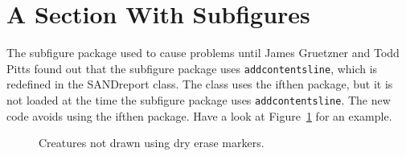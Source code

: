 \documentclass[pdf,ps2pdf,12pt,strict,OUO]{SANDreport}
\begin{document}
    \section{A Section With Subfigures}
	The subfigure package used to cause problems until James
	Gruetzner and Todd Pitts found out that the subfigure
	package uses {\tt addcontentsline}, which is redefined in
	the SANDreport class. The class uses the ifthen package,
	but it is not loaded at the time the subfigure package
	uses {\tt addcontentsline}.  The new code avoids using the
	ifthen package.  Have a look at Figure~\ref{fig:creatures}
	for an example.

	\begin{figure}[!btp]
	    \centering
	    \caption{Creatures not drawn using dry erase markers.}
	    \label{fig:creatures}
	\end{figure}
\end{document}
